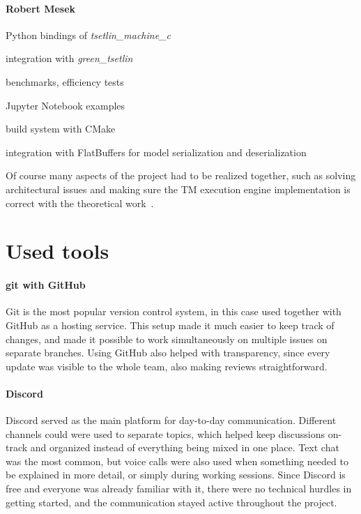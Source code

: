 \documentclass[english]{aghengthesis} %
\newcommand*{\LibraryName}{\emph{tsetlin\_machine\_c }}
\newcommand*{\GreenTsetlinName}{\emph{green\_tsetlin}~\cite{glimsdal2024greentsetlin} }
\begin{document}
\paragraph{Robert Mesek}
\begin{compactitem}
    \item Python bindings of \LibraryName
    \item integration with \GreenTsetlinName
    \item benchmarks, efficiency tests
    \item Jupyter Notebook examples
    \item build system with CMake
    \item integration with FlatBuffers for model serialization and deserialization
\end{compactitem}

Of course many aspects of the project had to be realized together, such as solving architectural issues and making sure the TM execution engine implementation is correct with the theoretical work~\cite{granmo2021tsetlinmachinegame}.

\section{Used tools}

\paragraph{git with GitHub}
Git is the most popular version control system, in this case used together with GitHub as a hosting service. This setup made it much easier to keep track of changes, and made it possible to work simultaneously on multiple issues on separate branches. Using GitHub also helped with transparency, since every update was visible to the whole team, also making reviews straightforward.

\paragraph{Discord}
Discord served as the main platform for day-to-day communication. Different channels could were used to separate topics, which helped keep discussions on-track and organized instead of everything being mixed in one place. Text chat was the most common, but voice calls were also used when something needed to be explained in more detail, or simply during working sessions. Since Discord is free and everyone was already familiar with it, there were no technical hurdles in getting started, and the communication stayed active throughout the project.
\end{document}
